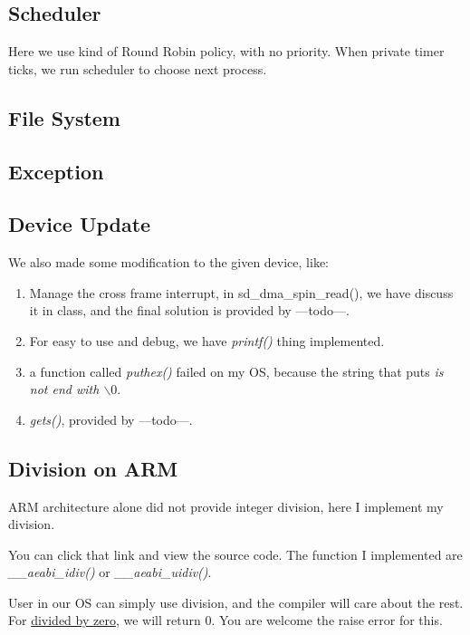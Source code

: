 \documentclass{article}
\begin{document}
\subsection{Scheduler}
Here we use kind of Round Robin policy, with no priority. When private timer ticks, we run scheduler to choose next process.

\subsection{File System}

\subsection{Exception}

\subsection{Device Update}

We also made some modification to the given device, like:

\begin{enumerate}
	\item	Manage the cross frame interrupt, in sd\_dma\_spin\_read(), we have discuss it in class, and the final solution is provided by ---todo---.
	\item	For easy to use and debug, we have \emph{printf()} thing implemented.
	\item a function called \emph{puthex()} failed on my OS, because the string that puts \emph{is not end with $\backslash 0$}.
	\item \emph{gets()}, provided by ---todo---.
\end{enumerate}

\subsection{Division on ARM}

ARM architecture alone did not provide integer division, here I implement my division.\cite{---todo---}

You can click that link and view the source code. The function I implemented are \emph{\_\_aeabi\_idiv()} or \emph{\_\_aeabi\_uidiv()}.

User in our OS can simply use division, and the compiler will care about the rest. For \underline{divided by zero}, we will return 0. You are welcome the raise error for this.
\end{document}

